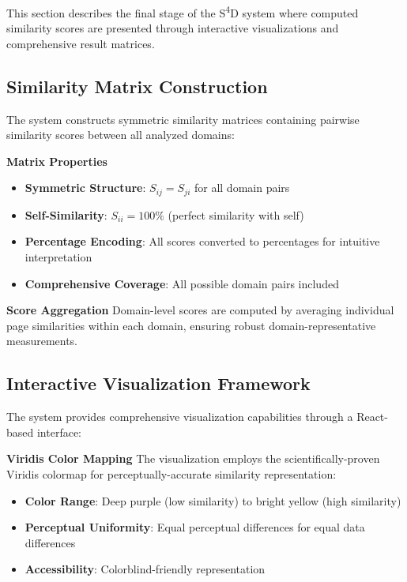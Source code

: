 This section describes the final stage of the S\textsuperscript{4}D system where computed similarity scores are presented through interactive visualizations and comprehensive result matrices.

\subsection{Similarity Matrix Construction}
\label{subsec:similarity-matrix-construction}

The system constructs symmetric similarity matrices containing pairwise similarity scores between all analyzed domains:

\textbf{Matrix Properties}
\begin{itemize}
    \item \textbf{Symmetric Structure}: $S_{ij} = S_{ji}$ for all domain pairs
    \item \textbf{Self-Similarity}: $S_{ii} = 100\%$ (perfect similarity with self)
    \item \textbf{Percentage Encoding}: All scores converted to percentages for intuitive interpretation
    \item \textbf{Comprehensive Coverage}: All possible domain pairs included
\end{itemize}

\textbf{Score Aggregation}
Domain-level scores are computed by averaging individual page similarities within each domain, ensuring robust domain-representative measurements.

\subsection{Interactive Visualization Framework}
\label{subsec:interactive-visualization}

The system provides comprehensive visualization capabilities through a React-based interface:

\textbf{Viridis Color Mapping}
The visualization employs the scientifically-proven Viridis colormap for perceptually-accurate similarity representation:

\begin{itemize}
    \item \textbf{Color Range}: Deep purple (low similarity) to bright yellow (high similarity)
    \item \textbf{Perceptual Uniformity}: Equal perceptual differences for equal data differences
    \item \textbf{Accessibility}: Colorblind-friendly representation
\end{itemize}

